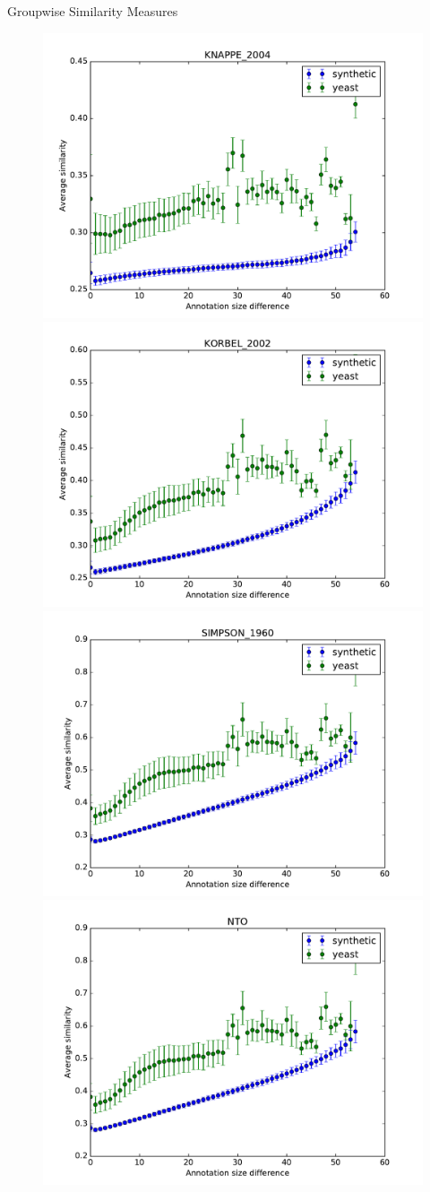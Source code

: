 \documentclass{beamer}
\begin{document}
\begin{frame}{Groupwise Similarity Measures}
\begin{figure}
\includegraphics[width=0.5\linewidth, height=0.4\textheight]{groupwise_diff/SIM_FRAMEWORK_DAG_SET_KNAPPE_2004_diff.pdf}
\includegraphics[width=0.5\linewidth, height=0.4\textheight]{groupwise_diff/SIM_FRAMEWORK_DAG_SET_KORBEL_2002_diff.pdf} \\
\includegraphics[width=0.5\linewidth, height=0.4\textheight]{groupwise_diff/SIM_FRAMEWORK_DAG_SET_SIMPSON_1960_diff.pdf}
\includegraphics[width=0.5\linewidth, height=0.4\textheight]{groupwise_diff/SIM_GROUPWISE_DAG_NTO_diff.pdf}
\end{figure}
\end{frame}
\end{document}
